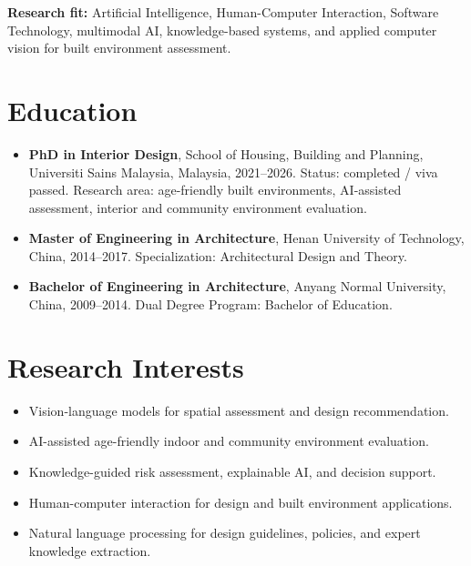 \documentclass[11pt,a4paper]{article}
\begin{document}
\textbf{Research fit:} Artificial Intelligence, Human-Computer Interaction, Software Technology, multimodal AI, knowledge-based systems, and applied computer vision for built environment assessment.

\section*{Education}
\begin{itemize}
  \item \textbf{PhD in Interior Design}, School of Housing, Building and Planning, Universiti Sains Malaysia, Malaysia, 2021--2026. Status: completed / viva passed. Research area: age-friendly built environments, AI-assisted assessment, interior and community environment evaluation.
  \item \textbf{Master of Engineering in Architecture}, Henan University of Technology, China, 2014--2017. Specialization: Architectural Design and Theory.
  \item \textbf{Bachelor of Engineering in Architecture}, Anyang Normal University, China, 2009--2014. Dual Degree Program: Bachelor of Education.
\end{itemize}

\section*{Research Interests}
\begin{itemize}
  \item Vision-language models for spatial assessment and design recommendation.
  \item AI-assisted age-friendly indoor and community environment evaluation.
  \item Knowledge-guided risk assessment, explainable AI, and decision support.
  \item Human-computer interaction for design and built environment applications.
  \item Natural language processing for design guidelines, policies, and expert knowledge extraction.
\end{itemize}
\end{document}
